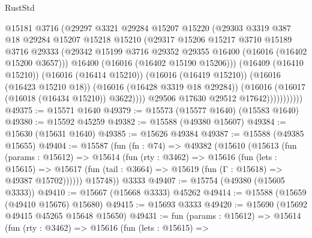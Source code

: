 \begin{lexlean}{RustStd}
\begin{coremodule}
                          @15181
                          @3716
                          (@29297
                            @3321
                            @29284
                            @15207
                            @15220
                            (@29303
                              @3319
                              @387
                              @18
                              @29284
                              @15207
                              @15218
                              @15210
                              (@29317
                                @15206
                                @15217
                                @3710
                                @15189
                                @3716
                                @29333
                                (@29342
                                  @15199
                                  @3716
                                  @29352
                                  @29355
                                  @16400
                                  (@16016 (@16402 @15200 @3657)))
                                @16400
                                (@16016 (@16402 @15190 @15206)))
                              (@16409 (@16410 @15210))
                              (@16016 (@16414 @15210))
                              (@16016 (@16419 @15210))
                              (@16016 (@16423 @15210 @18))
                              (@16016 (@16428 @3319 @18 @29284))
                              (@16016 (@16017 (@16018 (@16434 @15210)) @3622))))
                          @29506
                          @17630
                          @29512
                          @17642)))))))))))
@49375 := @15571 @1640
@49379 := @15573 (@15577 @1640) (@15583 @1640)
@49380 := @15592 @45259
@49382 := @15588 (@49380 @15607)
@49384 := @15630 (@15631 @1640)
@49385 := @15626 @49384
@49387 := @15588 (@49385 @15655)
@49404 := @15587
    (fun (fn : @74) =>
    @49382
      (@15610
        (@15613
          (fun (params : @15612) =>
          @15614
            (fun (rty : @3462) =>
            @15616
              (fun (lets : @15615) =>
              @15617 (fun (tail : @3664) => @15619 (fun (Γ : @15618) => @49387 @15702))))))
        @15748))
    @3333
@49407 := @15754 (@49380 (@15605 @3333))
@49410 := @15667 (@15668 @3333) @45262
@49414 := @15588 (@15659 (@49410 @15676) @15680)
@49415 := @15693 @3333
@49420 := @15690 (@15692 @49415 @45265 @15648 @15650)
@49431 := fun (params : @15612) =>
  @15614
    (fun (rty : @3462) =>
    @15616
      (fun (lets : @15615) =>

\end{coremodule}
\end{lexlean}
